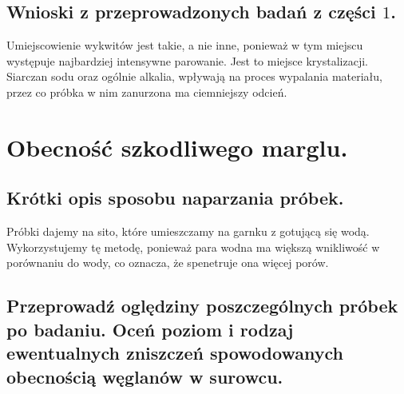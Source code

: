 \subsection{Wnioski z przeprowadzonych badań z części $1$.}

Umiejscowienie wykwitów jest takie, a nie inne, ponieważ w tym miejscu występuje najbardziej intensywne parowanie. Jest to miejsce krystalizacji. Siarczan sodu oraz ogólnie alkalia, wpływają na proces wypalania materiału, przez co próbka w nim zanurzona ma ciemniejszy odcień.

\newpage

\section{Obecność szkodliwego marglu.}



\subsection{Krótki opis sposobu naparzania próbek.}

Próbki dajemy na sito, które umieszczamy na garnku z gotującą się wodą. Wykorzystujemy tę metodę, ponieważ para wodna ma większą wnikliwość w porównaniu do wody, co oznacza, że spenetruje ona więcej porów.

\subsection{Przeprowadź oględziny poszczególnych próbek po badaniu. Oceń poziom i rodzaj ewentualnych zniszczeń spowodowanych obecnością węglanów w surowcu.}

